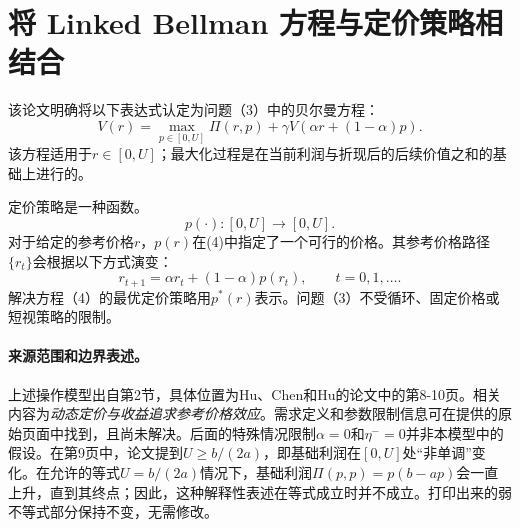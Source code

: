 \documentclass{article}
\begin{document}
\section*{将 Linked Bellman 方程与定价策略相结合}
该论文明确将以下表达式认定为问题（3）中的贝尔曼方程：
\begin{equation}
V(r)=\max_{p\in[0,U]}\Pi(r,p)+\gamma V(\alpha r+(1-\alpha)p).
\tag{4}
\end{equation}
该方程适用于$r\in[0,U]$；最大化过程是在当前利润与折现后的后续价值之和的基础上进行的。

定价策略是一种函数。
\[
p(\cdot):[0,U]\longrightarrow[0,U].
\]
对于给定的参考价格$r$，$p(r)$在(4)中指定了一个可行的价格。其参考价格路径$\{r_t\}$会根据以下方式演变：
\[
r_{t+1}=\alpha r_t+(1-\alpha)p(r_t),\qquad t=0,1,\ldots.
\]
解决方程（4）的最优定价策略用$p^*(r)$表示。问题（3）不受循环、固定价格或短视策略的限制。

\paragraph{来源范围和边界表述。}
上述操作模型出自第2节，具体位置为Hu、Chen和Hu的论文中的第8-10页。相关内容为\emph{动态定价与收益追求参考价格效应}。需求定义和参数限制信息可在提供的原始页面中找到，且尚未解决。后面的特殊情况限制$\alpha=0$和$\eta^-=0$并非本模型中的假设。在第9页中，论文提到$U\geq b/(2a)$，即基础利润在$[0,U]$处“非单调”变化。在允许的等式$U=b/(2a)$情况下，基础利润$\Pi(p,p)=p(b-ap)$会一直上升，直到其终点；因此，这种解释性表述在等式成立时并不成立。打印出来的弱不等式部分保持不变，无需修改。
\end{document}

